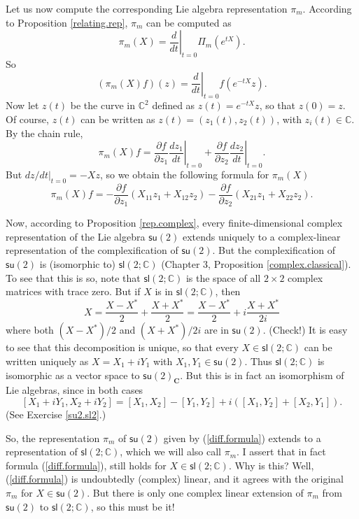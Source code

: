 \documentclass[12pt]{amsbook}
\theoremstyle{plain}
\numberwithin{equation}{chapter}
\numberwithin{theorem}{chapter}
\begin{document}
Let us now compute the corresponding Lie algebra representation $\pi_{m}$.
According to Proposition \ref{relating.rep}, $\pi_{m}$ can be computed as
\[
\pi_{m}(X)=\left.  \frac d{dt}\right|  _{t=0}\Pi_{m}\left(  e^{tX}\right)
\text{.}%
\]
So
\[
\left(  \pi_{m}(X)f\right)  (z)=\left.  \frac d{dt}\right|  _{t=0}f\left(
e^{-tX}z\right)  \text{.}%
\]
Now let $z(t)$ be the curve in $\mathbb{C}^{2}$ defined as $z(t)=e^{-tX}z$, so
that $z(0)=z$. Of course, $z(t)$ can be written as $z(t)=(z_{1}(t),z_{2}(t))$,
with $z_{i}(t)\in\mathbb{C}$. By the chain rule,
\[
\pi_{m}(X)f=\frac{\partial f}{\partial z_{1}}\left.  \frac{dz_{1}}{dt}\right|
_{t=0}+\frac{\partial f}{\partial z_{2}}\left.  \frac{dz_{2}}{dt}\right|
_{t=0}\text{.}%
\]
But $\left.  dz/dt\right|  _{t=0}=-Xz$, so we obtain the following formula for
$\pi_{m}(X)$
\begin{equation}
\pi_{m}(X)f=-\frac{\partial f}{\partial z_{1}}\left(  X_{11}z_{1}+X_{12}%
z_{2}\right)  -\frac{\partial f}{\partial z_{2}}\left(  X_{21}z_{1}%
+X_{22}z_{2}\right)  \text{.}\label{diff.formula}%
\end{equation}

Now, according to Proposition \ref{rep.complex}, every finite-dimensional
complex representation of the Lie algebra $\mathsf{su}(2)$ extends uniquely to
a complex-linear representation of the complexification of $\mathsf{su}(2)$.
But the complexification of $\mathsf{su}(2)$ is (isomorphic to) $\mathsf{sl}%
(2;\mathbb{C})$ (Chapter 3, Proposition \ref{complex.classical}). To see that
this is so, note that $\mathsf{sl}(2;\mathbb{C})$ is the space of all
$2\times2$ complex matrices with trace zero. But if $X$ is in $\mathsf{sl}%
(2;\mathbb{C})$, then
\[
X=\frac{X-X^{\ast}}{2}+\frac{X+X^{\ast}}{2}=\frac{X-X^{\ast}}{2}%
+i\frac{X+X^{\ast}}{2i}%
\]
where both $(X-X^{\ast})/2$ and $(X+X^{\ast})/2i$ are in $\mathsf{su}(2)$.
(Check!) It is easy to see that this decomposition is unique, so that every
$X\in\mathsf{sl}(2;\mathbb{C})$ can be written uniquely as $X=X_{1}+iY_{1}$
with $X_{1},Y_{1}\in\mathsf{su}(2)$. Thus $\mathsf{sl}(2;\mathbb{C})$ is
isomorphic as a vector space to $\mathsf{su}(2)_{\mathbf{C}}$. But this is in
fact an isomorphism of Lie algebras, since in both cases
\[
\left[  X_{1}+iY_{1},X_{2}+iY_{2}\right]  =\left[  X_{1},X_{2}\right]
-\left[  Y_{1},Y_{2}\right]  +i\left(  \left[  X_{1},Y_{2}\right]  +\left[
X_{2},Y_{1}\right]  \right)  \text{.}%
\]
(See Exercise \ref{su2.sl2}.)

So, the representation $\pi_{m}$ of $\mathsf{su}(2)$ given by
(\ref{diff.formula}) extends to a representation of $\mathsf{sl}%
(2;\mathbb{C})$, which we will also call $\pi_{m}$. I assert that in fact
formula (\ref{diff.formula}), still holds for $X\in\mathsf{sl}(2;\mathbb{C})$.
Why is this? Well, (\ref{diff.formula}) is undoubtedly (complex) linear, and
it agrees with the original $\pi_{m}$ for $X\in\mathsf{su}(2)$. But there is
only one complex linear extension of $\pi_{m}$ from $\mathsf{su}(2)$ to
$\mathsf{sl}(2;\mathbb{C})$, so this must be it!
\end{document}
